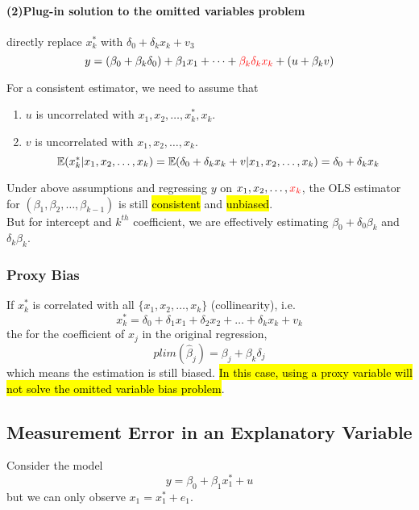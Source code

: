 \documentclass[]{article}
\begin{document}
				\paragraph{(2)Plug-in solution to the omitted variables problem} directly replace $x^*_k$ with $\delta_0 + \delta_k x_k + v_3$
				\begin{equation}
					y = (\beta_0 + \beta_k \delta_0) + \beta_1 x_1 + \dots + \textcolor{red}{\beta_k \delta_k x_k} + (u + \beta_k v)
				\end{equation}
				\begin{assumption}
					For a consistent estimator, we need to assume that
					\begin{enumerate}
						\item $u$ is uncorrelated with $x_1, x_2, \dots, x_k^{*}, x_k$. 
						\item $v$ is uncorrelated with $x_1, x_2, \dots, x_k$.
						\[
							\mathbb{E}({x_k^{*}|x_1,x_2,\dots,x_k}) = \mathbb{E}({\delta_0 + \delta_k x_k + v|x_1,x_2,\dots,x_k}) = \delta_0 + \delta_k x_k
						\]
					\end{enumerate}
				\end{assumption}
				\begin{remark}
					Under above assumptions and regressing $y$ on $x_1, x_2, \dots, \textcolor{red}{x_k}$, the OLS estimator for $(\beta_1, \beta_2, \dots, \beta_{k-1})$ is still \hl{consistent} and \hl{unbiased}.\\
					 But for intercept and $k^{th}$ coefficient, we are effectively estimating $\beta_0 + \delta_0 \beta_k$ and $\delta_k \beta_k$.
				\end{remark}
			\subsubsection{Proxy Bias}
				If $x_k^{*}$ is correlated with all $\{x_1, x_2, \dots, x_k\}$ (collinearity), i.e. 
				\[
					x_k^{*} = \delta_0 + \delta_1 x_1 + \delta_2 x_2 + \dots + \delta_k x_k + v_k
				\]
				the for the coefficient of $x_j$ in the original regression, 
				\[
					plim(\hat{\beta}_j) = \beta_j + \beta_k \delta_j
				\]
				which means the estimation is still biased. \hl{In this case, using a proxy variable will not solve the omitted variable bias problem}.
				
		\subsection{Measurement Error in an Explanatory Variable}
			\par Consider the model 
			\[
				y = \beta_0 + \beta_1 x_1^{*} + u
			\]
			but we can only observe $x_1 = x_1^{*} + e_1$. 
			
\end{document}
